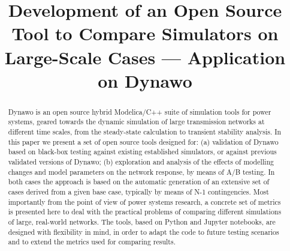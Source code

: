 \documentclass[conference]{IEEEtran}
\begin{document}
\title{Development of an Open Source Tool to Compare Simulators on
  Large-Scale Cases --- Application on Dynawo}


\author{
}

\maketitle

\begin{abstract}
  Dynawo is an open source hybrid Modelica/C++ suite of simulation tools for
  power systems, geared towards the dynamic simulation of large transmission
  networks at different time scales, from the steady-state calculation to
  transient stability analysis. In this paper we present a set of open source
  tools designed for: (a) validation of Dynawo based on black-box testing
  against existing established simulators, or against previous validated
  versions of Dynawo; (b) exploration and analysis of the effects of modelling
  changes and model parameters on the network response, by means of A/B
  testing. In both cases the approach is based on the automatic generation of an
  extensive set of cases derived from a given base case, typically by means of
  N-1 contingencies. Most importantly from the point of view of power systems
  research, a concrete set of metrics is presented here to deal with the
  practical problems of comparing different simulations of large, real-world
  networks. The tools, based on Python and Jupyter notebooks, are designed with
  flexibility in mind, in order to adapt the code to future testing scenarios
  and to extend the metrics used for comparing results.
\end{abstract}
\end{document}
